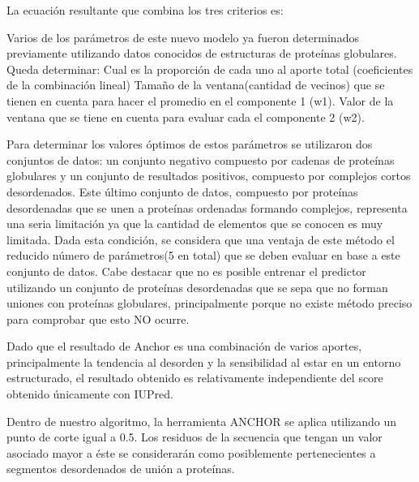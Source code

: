 La ecuación resultante que combina los tres criterios es:

  
  
Varios de los parámetros de este nuevo modelo ya fueron determinados previamente utilizando datos conocidos de estructuras de proteínas globulares. Queda determinar:
Cual es la proporción de cada uno al aporte total (coeficientes de la combinación lineal) 
Tamaño de la ventana(cantidad de vecinos) que se tienen en cuenta para hacer el promedio en el componente 1 (w1).
Valor de la ventana que se tiene en cuenta para evaluar cada el componente 2 (w2).

Para determinar los valores óptimos de estos parámetros se utilizaron dos conjuntos de datos: un conjunto negativo compuesto por cadenas de proteínas globulares y un conjunto de resultados
positivos, compuesto por complejos cortos desordenados. Este último conjunto de datos, compuesto por proteínas desordenadas que se unen a proteínas ordenadas formando complejos,
representa una seria limitación ya que la cantidad de elementos que se conocen es muy limitada. Dada esta condición, se considera que una ventaja de este método el reducido número de 
parámetros(5 en total) que se deben evaluar en base a este conjunto de datos.
Cabe destacar que no es posible entrenar el predictor utilizando un conjunto de proteínas desordenadas que se sepa que no forman uniones con proteínas globulares, principalmente 
porque no existe método preciso para comprobar que esto NO ocurre.

Dado que el resultado de Anchor es una combinación de varios aportes, principalmente la tendencia al desorden y la sensibilidad al estar en un entorno estructurado, 
el resultado obtenido es relativamente independiente del score obtenido únicamente con IUPred. 

Dentro de nuestro algoritmo, la herramienta ANCHOR se aplica utilizando un punto de corte igual a 0.5. Los residuos de la secuencia que tengan un valor asociado mayor a 
éste se considerarán como posiblemente pertenecientes a segmentos desordenados de unión a proteínas.   























